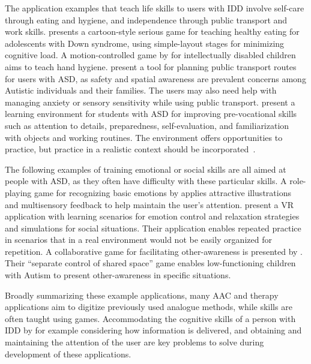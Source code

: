 \documentclass[utf8,english]{gradu3}
\begin{document}
The application examples that teach life skills to users with IDD
involve self-care through eating and hygiene,
and independence through public transport and work skills.
\textcite{hatzi2015} presents a cartoon-style serious game for teaching healthy eating
for adolescents with Down syndrome, using simple-layout stages for minimizing cognitive load.
A motion-controlled game by \textcite{kang2019} for intellectually disabled children aims to teach hand hygiene.
\textcite{rezae2019} present a tool for planning public transport routes for users with ASD,
as safety and spatial awareness are prevalent concerns among Autistic individuals and their families.
The users may also need help with managing anxiety or sensory sensitivity while using public transport.
\textcite{tsiopela2017} present a learning environment for students with ASD for improving pre-vocational skills
such as attention to details, preparedness, self-evaluation, and familiarization with objects and working routines.
The environment offers opportunities to practice,
but practice in a realistic context should be incorporated~\parencite{tsiopela2017}.

The following examples of training emotional or social skills are all aimed at people with ASD,
as they often have difficulty with these particular skills.
A role-playing game for recognizing basic emotions by \textcite{almeida2019}
applies attractive illustrations and multisensory feedback to help maintain the user's attention.
\textcite{ip2018} present a VR application with learning scenarios for emotion control and relaxation strategies
and simulations for social situations. Their application enables repeated practice in scenarios
that in a real environment would not be easily organized for repetition.
A collaborative game for facilitating other-awareness is presented by \textcite{holt2014}.
Their ``separate control of shared space'' game enables low-functioning children with Autism
to present other-awareness in specific situations.

Broadly summarizing these example applications,
many AAC and therapy applications aim to digitize previously used analogue methods,
while skills are often taught using games.
Accommodating the cognitive skills of a person with IDD by for example
considering how information is delivered, and
obtaining and maintaining the attention of the user
are key problems to solve during development of these applications.


\end{document}
